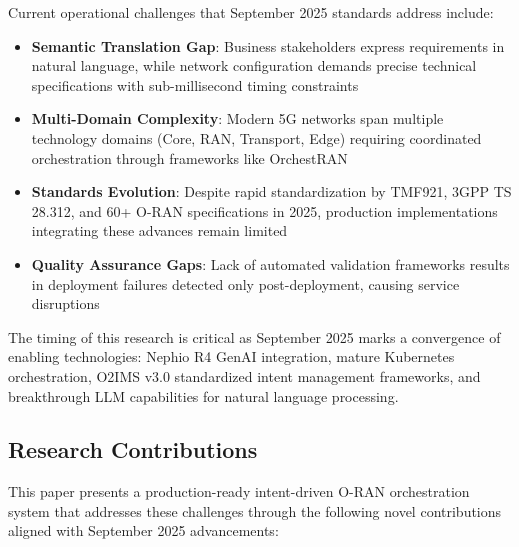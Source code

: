 Current operational challenges that September 2025 standards address include:
\begin{itemize}
\item \textbf{Semantic Translation Gap}: Business stakeholders express requirements in natural language, while network configuration demands precise technical specifications with sub-millisecond timing constraints
\item \textbf{Multi-Domain Complexity}: Modern 5G networks span multiple technology domains (Core, RAN, Transport, Edge) requiring coordinated orchestration through frameworks like OrchestRAN
\item \textbf{Standards Evolution}: Despite rapid standardization by TMF921, 3GPP TS 28.312, and 60+ O-RAN specifications in 2025, production implementations integrating these advances remain limited
\item \textbf{Quality Assurance Gaps}: Lack of automated validation frameworks results in deployment failures detected only post-deployment, causing service disruptions
\end{itemize}

The timing of this research is critical as September 2025 marks a convergence of enabling technologies: Nephio R4 GenAI integration, mature Kubernetes orchestration, O2IMS v3.0 standardized intent management frameworks, and breakthrough LLM capabilities for natural language processing.

\subsection{Research Contributions}

This paper presents a production-ready intent-driven O-RAN orchestration system that addresses these challenges through the following novel contributions aligned with September 2025 advancements:

